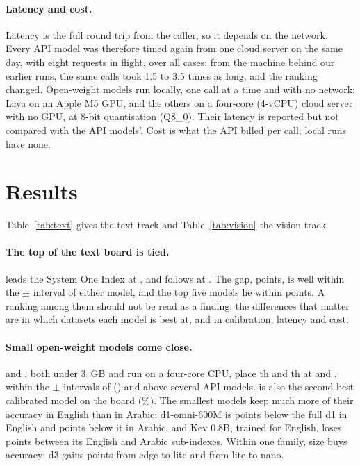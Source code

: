 \documentclass[11pt]{article}
\begin{document}
\paragraph{Latency and cost.} Latency is the full round trip from the caller, so it depends on the network. Every API
model was therefore timed again from one cloud server on the same day, with eight requests in flight, over all
\nCases{} cases; from the machine behind our earlier runs, the same calls took 1.5 to 3.5 times as long, and the
ranking changed. Open-weight models run locally, one call at a time and with no network: Laya on an Apple M5 GPU, and
the others on a four-core (4-vCPU) cloud server with no GPU, at 8-bit quantisation (Q8\_0). Their latency is reported
but not compared with the API models'. Cost is what the API billed per call; local runs have none.

\section{Results}\label{sec:results}

Table~\ref{tab:text} gives the text track and Table~\ref{tab:vision} the vision track.

\paragraph{The top of the text board is tied.} \topText{} leads the System One Index at \topTextIdx{}, and
\secondText{} follows at \secondTextIdx{}. The gap, \topTextGap{} points, is well within the $\pm$\topTextCI{}
interval of either model, and the top five models lie within \topFiveSpread{} points. A ranking among them should not
be read as a finding; the differences that matter are in which datasets each model is best at, and in calibration,
latency and cost.

\paragraph{Small open-weight models come close.} \localA{} and \localB{}, both under 3~GB and run on a four-core
CPU, place \localARank{}th and \localBRank{}th at \localAIdx{} and \localBIdx{}, within the $\pm$\localCI{} intervals
of \aboveLocal{} (\aboveLocalIdx{}) and above several API models. \localA{} is also the second best calibrated model on
the board (\eceSecondVal{}\%). The smallest models keep much more of their accuracy in English than in Arabic:
d1-omni-600M is \omniEnGap{} points below the full d1 in English and \omniArGap{} points below it in Arabic, and Kev
0.8B, trained for English, loses \kevSmallGap{} points between its English and Arabic sub-indexes. Within one family,
size buys accuracy: d3 gains \dThreeEdgeLite{} points from edge to lite and \dThreeLiteNano{} from lite to nano.
\end{document}
